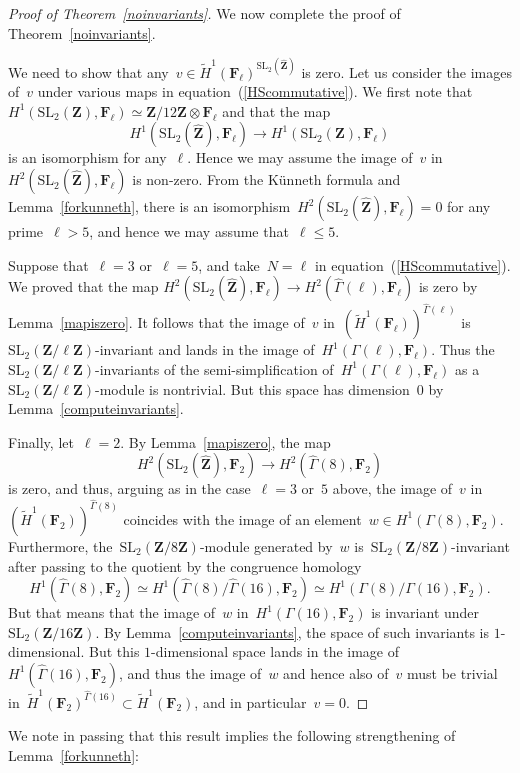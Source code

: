 \documentclass[10pt]{amsart}
\def\Gammah{\widehat{\Gamma}}
\def\Zhat{\widehat{\Z}}
\def\Htw{\widetilde{H}}
\def\F{\mathbf{F}}
\def\Z{\mathbf{Z}}
\theoremstyle{remark}
\numberwithin{equation}{subsection}
\def\SL{\mathrm{SL}}
\begin{document}
\begin{proof}[Proof of Theorem~\ref{noinvariants}]
We now complete the proof of Theorem~\ref{noinvariants}.

We need to show that any~$v \in \Htw^1(\F_{\ell})^{\SL_2(\Zhat)}$ is zero.
Let us consider the images of~$v$ under various 
maps in equation~(\ref{HScommutative}).
We first note that~$H^1(\SL_2(\Z),\F_{\ell}) \simeq \Z/12\Z \otimes \F_{\ell}$ and that the map
 $$H^1(\SL_2(\Zhat),\F_{\ell}) \rightarrow H^1(\SL_2(\Z),\F_{\ell})$$
 is an 
isomorphism for any~$\ell$. Hence we may assume the image of~$v$ in~$H^2(\SL_2(\Zhat),\F_{\ell})$
is non-zero.
  From the K\"{u}nneth formula
and Lemma~\ref{forkunneth},  there is an isomorphism~$H^2(\SL_2(\Zhat),\F_{\ell}) = 0$
for any prime~$\ell > 5$, and hence we may assume that~$\ell \le 5$.

Suppose that~$\ell = 3$ or~$\ell = 5$, and take~$N = \ell$ in equation~(\ref{HScommutative}). We
proved that the map
$H^2(\SL_2(\Zhat),\F_{\ell}) \rightarrow H^2(\Gammah(\ell),\F_{\ell})$
is zero by Lemma~\ref{mapiszero}. It follows that the image of~$v$
in~$(\Htw^1(\F_{\ell}))^{\Gammah(\ell)}$  is~$\SL_2(\Z/\ell \Z)$-invariant
and lands in the image of~$H^1(\Gamma(\ell),\F_{\ell})$.
Thus the~$\SL_2(\Z/\ell\Z)$-invariants of the semi-simplification
of~$H^1(\Gamma(\ell),\F_{\ell})$ as a~$\SL_2(\Z/\ell\Z)$-module is nontrivial.
But this space has dimension~$0$ by Lemma~\ref{computeinvariants}.

Finally, let~$\ell = 2$. By Lemma~\ref{mapiszero}, the map
$$H^2(\SL_2(\Zhat),\F_{2}) \rightarrow H^2(\Gammah(8),\F_{2})$$
is zero, and thus, arguing as in the case~$\ell =3$ or~$5$ above,
  the image of~$v$ in~$(\Htw^1(\F_{2}))^{\Gammah(8)}$ 
coincides with the image of an element~$w \in H^1(\Gamma(8),\F_2)$.
Furthermore, the~$\SL_2(\Z/8\Z)$-module generated by~$w$
is~$\SL_2(\Z/8\Z)$-invariant  after passing to the quotient by the congruence homology
$$H^1(\Gammah(8),\F_2) \simeq H^1(\Gammah(8)/\Gammah(16),\F_2) \simeq H^1(\Gamma(8)/\Gamma(16),\F_2).$$
But that means that the image of~$w$ in~$H^1(\Gamma(16),\F_2)$
 is invariant under~$\SL_2(\Z/16 \Z)$. By
Lemma~\ref{computeinvariants}, the space of such invariants is 
$1$-dimensional. But this $1$-dimensional space lands in the image
of~$H^1(\Gammah(16),\F_2)$,  and thus the image of~$w$ and hence also of~$v$ must be trivial 
in~$\Htw^1(\F_2)^{\Gammah(16)} \subset \Htw^1(\F_2)$, and in particular~$v = 0$.
\end{proof}

We note in passing that this result implies 
the following strengthening of
Lemma~\ref{forkunneth}:
\end{document}

